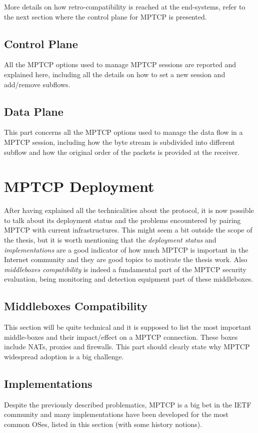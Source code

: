 More details on how retro-compatibility is reached at the end-systems, refer to the next section where the control plane for MPTCP is presented. 

\subsection{Control Plane}
All the MPTCP options used to manage MPTCP sessions are reported and explained here, including all the details on how to set a new session and add/remove subflows.

\subsection{Data Plane}
This part concerns all the MPTCP options used to manage the data flow in a MPTCP session, including how the byte stream is subdivided into different subflow and how the original order of the packets is provided at the receiver.

\section{MPTCP Deployment}
After having explained all the technicalities about the protocol, it is now possible to talk about its deployment status and the problems encountered by pairing MPTCP with current infrastructures. This might seem a bit outside the scope of the thesis, but it is worth mentioning that the \textit{deployment status} and \textit{implementations} are a good indicator of how much MPTCP is important in the Internet community and they are good topics to motivate the thesis work. Also \textit{middleboxes compatibility} is indeed a fundamental part of the MPTCP security evaluation, being monitoring and detection equipment part of these middleboxes.

\subsection{Middleboxes Compatibility}
This section will be quite technical and it is supposed to list the most important middle-boxes and their impact/effect on a MPTCP connection. These boxes include NATs, proxies and firewalls. This part should clearly state why MPTCP widespread adoption is a big challenge.

\subsection{Implementations}
Despite the previously described problematics, MPTCP is a big bet in the IETF community and many implementations have been developed for the most common OSes, listed in this section (with some history notions).

